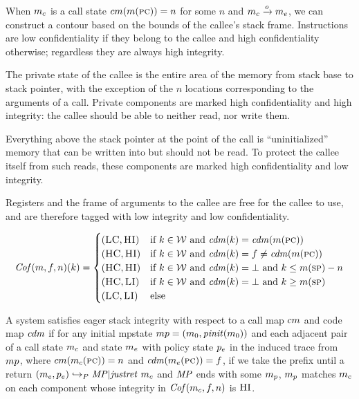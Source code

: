 \documentclass[acmsmall,review,anonymous]{acmart}\settopmatter{printfolios=true,printccs=false,printacmref=false}
\begin{document}

  When \(m_c\) is a call state \(cm(m(\textsc{pc})) = n\) for some
  \(n\) and \(m_c \xrightarrow{o} m_e\), we can construct a contour
  based on the bounds of the callee's stack frame. Instructions are low
  confidentiality if they belong to the callee and high confidentiality
  otherwise; regardless they are always high integrity.
 
  The private state of the callee is the entire area of the memory from stack
  base to stack pointer, with the exception of the $n$ locations
  corresponding to the arguments of a call. Private components are marked
  high confidentiality and high integrity: the callee should be able to
  neither read, nor write them.
  
  Everything above the stack pointer at the point of the call is
  ``uninitialized'' memory that can be written into but should not be
  read. To protect the callee itself from such reads, these components
  are marked high confidentiality and low integrity.
 
  Registers and the frame of arguments to the callee are free for the
  callee to use, and are therefore tagged with low integrity and low
  confidentiality. 

 \[\mathit{Cof}(m,f,n)(k) =
  \begin{cases}
    (\textsc{LC},\textsc{HI}) & \text{if } k \in {\mathcal W}
                         \text{ and } \mathit{cdm}(k) = \mathit{cdm}(m(\textsc{pc})) \\
    (\textsc{HC},\textsc{HI}) & \text{if } k \in {\mathcal W}
                          \text{ and } \mathit{cdm}(k) = f \not = \mathit{cdm}(m(\textsc{pc})) \\
    (\textsc{HC},\textsc{HI}) & \text{if } k \in {\mathcal W} \text{ and } \mathit{cdm}(k) = \bot
                          \text{ and } k \leq m(\textsc{sp}) - n \\
    (\textsc{HC},\textsc{LI}) & \text{if } k \in {\mathcal W} \text{ and } \mathit{cdm}(k) = \bot
                         \text{ and } k \geq m(\textsc{sp}) \\
    (\textsc{LC},\textsc{LI}) & \text{else} \\
  \end{cases}\]


  A system satisfies eager stack integrity with respect to a call map
  \(cm\) and code map \(\mathit{cdm}\) if for any initial mpstate
  \(mp = (m_0,\mathit{pinit}(m_0))\) and each
  adjacent pair of a call state \(m_c\) and state \(m_e\) with policy
  state \(p_e\) in the induced trace from \(mp\), where
  \(cm(m_c(\textsc{pc})) = n\) and \(\mathit{cdm}(m_e(\textsc{pc})) =
  f\), if we take the prefix until a return
  \((m_e,p_e) \hookrightarrow_P \mathit{MP} | \mathit{justret}\ m_c\) and
  \(\mathit{MP}\) ends with some \(m_p\), \(m_p\) matches \(m_c\) on each
  component whose integrity in \(\mathit{Cof}(m_c,f,n)\) is
  \(\textsc{HI}\).
\end{document}
